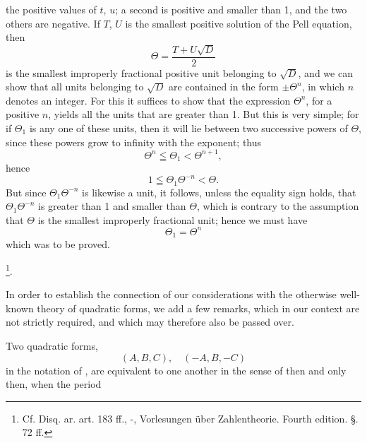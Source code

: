 the positive values of $t$, $u$; a second is positive and
smaller than 1, and the two others are negative. If $T$, $U$
is the smallest positive solution of the Pell equation, then
\[
\Theta = \frac{T + U\sqrt{D}}{2}
\]
is the smallest improperly fractional positive unit belonging to $\sqrt{D}$,
and we can show that all units belonging to $\sqrt{D}$ are contained
in the form $\pm \Theta^n$, in which $n$ denotes an integer. For this
it suffices to show that the expression $\Theta^n$, for a positive $n$,
yields all the units that are greater than 1.
But this is very simple; for if $\Theta_1$ is any one of these
units, then it will lie between two successive
powers of $\Theta$, since these powers grow to infinity with the
exponent; thus
\[
\Theta^n \leqq \Theta_1 < \Theta^{n+1},
\]
hence
\[
1 \leqq \Theta_1 \Theta^{-n} < \Theta.
\]
But since $\Theta_1 \Theta^{-n}$ is likewise a unit, it follows, unless
the equality sign holds, that $\Theta_1 \Theta^{-n}$ is greater than 1 and smaller than
$\Theta$, which is contrary to the assumption that $\Theta$ is the smallest
improperly fractional unit; hence we must have
\[
\Theta_1 = \Theta^n
\]
which was to be proved.

\footnote{Cf. Disq. ar. art. 183 ff., -, Vorlesungen
über Zahlentheorie. Fourth edition. \S.\,72 ff.}.

In order to establish the connection of our considerations with
the otherwise well-known  theory of quadratic
forms, we add a few remarks, which in our
context are not strictly required, and which may therefore
also be passed over.

Two quadratic forms,
\[
(A, B, C), \quad (-A, B, -C)
\]
in the notation of , are equivalent to one another in
the sense of  then and only then, when the period
